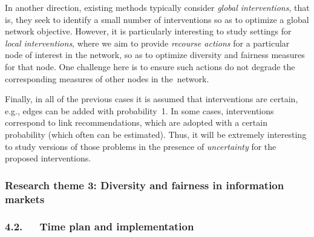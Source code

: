 \documentclass[a4paper,11pt]{article}
\begin{document}
In another direction, existing methods typically consider \emph{global interventions}, 
that is, they seek to identify a small number of interventions so as to 
optimize a global network objective. 
However, it is particularly interesting to study settings for \emph{local interventions}, 
where we aim to provide \emph{recourse actions} for a particular node of interest in the network, 
so as to optimize diversity and fairness measures for that node. 
One challenge here is to ensure such actions do not degrade 
the corresponding measures of other nodes in the~network. 

Finally, in all of the previous cases it is assumed that interventions are certain, 
e.g., edges can be added with probability~1.
In some cases, interventions correspond to link recommendations, 
which are adopted with a certain probability
(which often can be estimated).
Thus, it will be extremely interesting to study versions of those problems
in the presence of \emph{uncertainty} for the proposed interventions.




\subsubsection*{Research theme 3: Diversity and fairness in information markets}


\subsubsection*{4.2.~~~Time plan and implementation}

\end{document}
